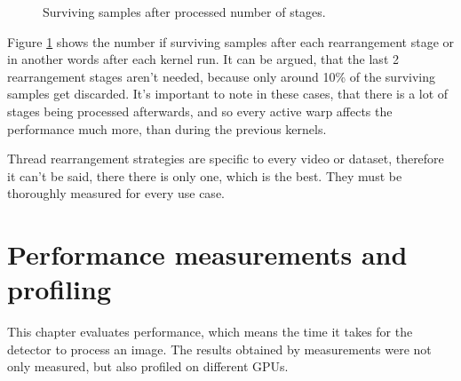 \begin{figure}[h]
\centering{}
	\caption{Surviving samples after processed number of stages.}
	\label{fig:survivor-count}
\end{figure}

Figure \ref{fig:survivor-count} shows the number if surviving samples after each rearrangement stage or in another words after each kernel run. It can be argued, that the last 2 rearrangement stages aren't needed, because only around 10\% of the surviving samples get discarded. It's important to note in these cases, that there is a lot of stages being processed afterwards, and so every active warp affects the performance much more, than during the previous kernels.

Thread rearrangement strategies are specific to every video or dataset, therefore it can't be said, there there is only one, which is the best. They must be thoroughly measured for every use case.

\chapter{Performance measurements and profiling}

This chapter evaluates performance, which means the time it takes for the detector to process an image. The results obtained by measurements were not only measured, but also profiled on different GPUs.

